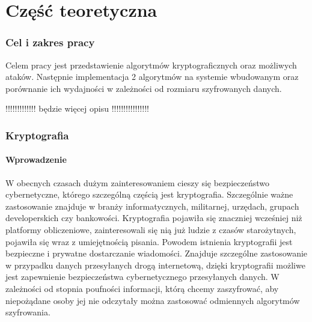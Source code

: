 \documentclass[12p]{article}
\begin{document}
\tableofcontents
\newpage
\part{Część teoretyczna}
\section{Cel i zakres pracy}
\quad Celem pracy jest przedstawienie algorytmów kryptograficznych oraz możliwych ataków. Następnie implementacja 2 algorytmów na systemie wbudowanym oraz porównanie ich wydajności w zależności od rozmiaru szyfrowanych danych.

!!!!!!!!!!!!! będzie więcej opisu !!!!!!!!!!!!!!!!

\newpage
\section{Kryptografia}
\subsection{Wprowadzenie}

\quad W obecnych czasach dużym zainteresowaniem cieszy się bezpieczeństwo cybernetyczne, którego szczególną częścią jest kryptografia. Szczególnie ważne zastosowanie znajduje w branży informatycznych, militarnej, urzędach, grupach developerskich czy bankowości. Kryptografia pojawiła się znaczniej wcześniej niż platformy obliczeniowe, zainteresowali się nią już ludzie z czasów starożytnych, pojawiła się wraz z umiejętnością pisania. Powodem istnienia kryptografii jest bezpieczne i prywatne dostarczanie wiadomości. Znajduje szczególne zastosowanie w przypadku danych przesyłanych drogą internetową, dzięki kryptografii możliwe jest zapewnienie bezpieczeństwa cybernetycznego przesyłanych danych. W zależności od stopnia poufności informacji, którą chcemy zaszyfrować, aby niepożądane osoby jej nie odczytały można zastosować odmiennych algorytmów szyfrowania. 
\end{document}
